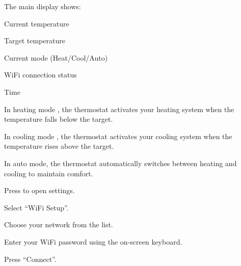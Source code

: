 \documentclass[11pt,a4paper]{article}
\begin{document}


The main display shows:
\begin{tbkList}
  \item Current temperature
  \item Target temperature
  \item Current mode (Heat/Cool/Auto)
  \item WiFi connection status
  \item Time
\end{tbkList}


\begin{tbkOperationTable}[caption={Touch Controls}]
\end{tbkOperationTable}



In heating mode , the thermostat activates your heating system when the temperature falls below the target.


In cooling mode , the thermostat activates your cooling system when the temperature rises above the target.


In auto mode, the thermostat automatically switches between heating and cooling to maintain comfort.


\begin{tbkSteps}
  \item Press  to open settings.
  \item Select ``WiFi Setup''.
  \item Choose your network from the list.
  \item Enter your WiFi password using the on-screen keyboard.
  \item Press ``Connect''.
\end{tbkSteps}

\end{document}

